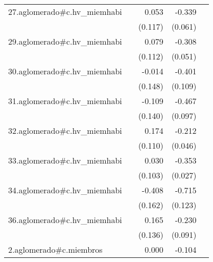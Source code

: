 {\begin{longtable}{l*{4}{D{.}{.}{-1}}}
\addlinespace
27.aglomerado#c.hv\_miemhabi&                     &       0.053         &      -0.339\sym{***}&                     \\
            &                     &     (0.117)         &     (0.061)         &                     \\
\addlinespace
29.aglomerado#c.hv\_miemhabi&                     &       0.079         &      -0.308\sym{***}&                     \\
            &                     &     (0.112)         &     (0.051)         &                     \\
\addlinespace
30.aglomerado#c.hv\_miemhabi&                     &      -0.014         &      -0.401\sym{***}&                     \\
            &                     &     (0.148)         &     (0.109)         &                     \\
\addlinespace
31.aglomerado#c.hv\_miemhabi&                     &      -0.109         &      -0.467\sym{***}&                     \\
            &                     &     (0.140)         &     (0.097)         &                     \\
\addlinespace
32.aglomerado#c.hv\_miemhabi&                     &       0.174         &      -0.212\sym{***}&                     \\
            &                     &     (0.110)         &     (0.046)         &                     \\
\addlinespace
33.aglomerado#c.hv\_miemhabi&                     &       0.030         &      -0.353\sym{***}&                     \\
            &                     &     (0.103)         &     (0.027)         &                     \\
\addlinespace
34.aglomerado#c.hv\_miemhabi&                     &      -0.408\sym{*}  &      -0.715\sym{***}&                     \\
            &                     &     (0.162)         &     (0.123)         &                     \\
\addlinespace
36.aglomerado#c.hv\_miemhabi&                     &       0.165         &      -0.230\sym{*}  &                     \\
            &                     &     (0.136)         &     (0.091)         &                     \\
\addlinespace
2.aglomerado#c.miembros&                     &       0.000         &      -0.104\sym{***}&                     \\

\end{longtable}}
